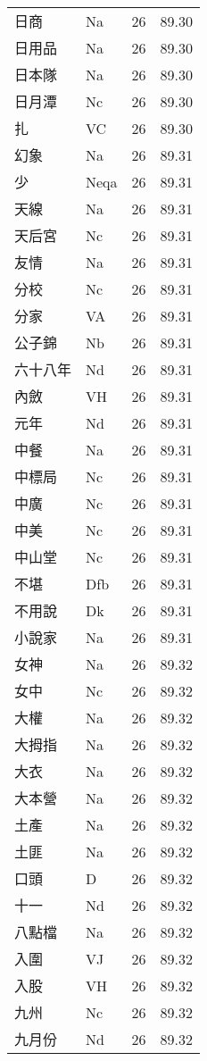 \documentclass[twocolumn]{book}
\begin{document}
\begin{supertabular}{llrr}
日商 & Na & 26 &  89.30\\
日用品 & Na & 26 &  89.30\\
日本隊 & Na & 26 &  89.30\\
日月潭 & Nc & 26 &  89.30\\
扎 & VC & 26 &  89.30\\
幻象 & Na & 26 &  89.31\\
少 & Neqa & 26 &  89.31\\
天線 & Na & 26 &  89.31\\
天后宮 & Nc & 26 &  89.31\\
友情 & Na & 26 &  89.31\\
分校 & Nc & 26 &  89.31\\
分家 & VA & 26 &  89.31\\
公子錦 & Nb & 26 &  89.31\\
六十八年 & Nd & 26 &  89.31\\
內斂 & VH & 26 &  89.31\\
元年 & Nd & 26 &  89.31\\
中餐 & Na & 26 &  89.31\\
中標局 & Nc & 26 &  89.31\\
中廣 & Nc & 26 &  89.31\\
中美 & Nc & 26 &  89.31\\
中山堂 & Nc & 26 &  89.31\\
不堪 & Dfb & 26 &  89.31\\
不用說 & Dk & 26 &  89.31\\
小說家 & Na & 26 &  89.31\\
女神 & Na & 26 &  89.32\\
女中 & Nc & 26 &  89.32\\
大權 & Na & 26 &  89.32\\
大拇指 & Na & 26 &  89.32\\
大衣 & Na & 26 &  89.32\\
大本營 & Na & 26 &  89.32\\
土產 & Na & 26 &  89.32\\
土匪 & Na & 26 &  89.32\\
口頭 & D & 26 &  89.32\\
十一 & Nd & 26 &  89.32\\
八點檔 & Na & 26 &  89.32\\
入圍 & VJ & 26 &  89.32\\
入股 & VH & 26 &  89.32\\
九州 & Nc & 26 &  89.32\\
九月份 & Nd & 26 &  89.32\\

\end{supertabular}
\end{document}
